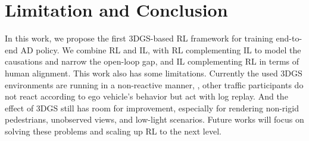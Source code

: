 \section{Limitation and Conclusion}
In this work, we propose the first 3DGS-based RL framework for training end-to-end AD policy. We combine RL and IL, with RL complementing IL to model the causations and narrow the open-loop gap, and IL complementing RL in terms of human alignment.
This work also has some limitations.
Currently the used 3DGS environments are running in a non-reactive manner, \ie, other traffic participants do not react according to ego vehicle's behavior but act with log replay.  And the effect of 3DGS still has room for improvement, especially for rendering non-rigid pedestrians, unobserved views, and low-light scenarios. Future works will focus on solving these problems and scaling up RL to the next level.